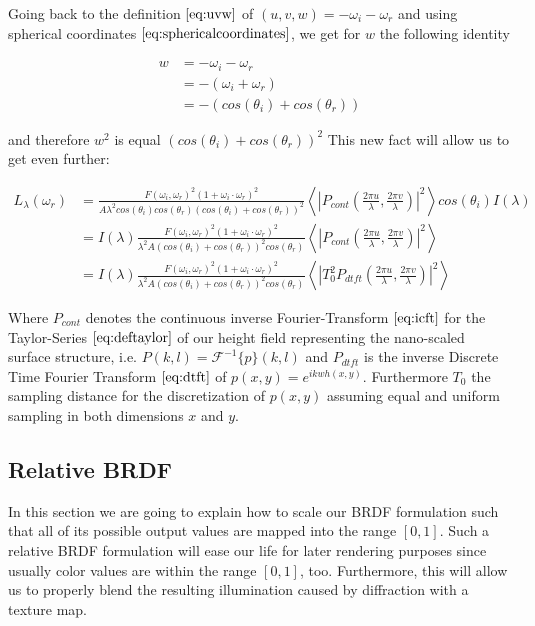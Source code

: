 Going back to the definition $\ref{eq:uvw}$ of $(u,v,w)= -\omega_i - \omega_r$ and using spherical coordinates $\ref{eq:sphericalcoordinates}$, we get for $w$ the following identity

\begin{align}
w 
&= -\omega_i - \omega_r \nonumber \\ 
&= -(\omega_i + \omega_r) \nonumber \\
&= -\left( cos(\theta_i)+cos(\theta_r) \right) 
\end{align}

and therefore $w^2$ is equal $(cos(\theta_i)+cos(\theta_r))^2$
This new fact will allow us to get even further:

\begin{align}
L_{\lambda}(\omega_r) 
& = \frac{F(\omega_i, \omega_r)^2 (1 + \omega_i \cdot \omega_r)^2}{A \lambda^2 cos(\theta_i)cos(\theta_r)  (cos(\theta_i)+cos(\theta_r))^2} \left \langle \left|P_{cont}\left( \frac{2\pi u}{\lambda}, \frac{2\pi v}{\lambda}\right) \right|^2 \right \rangle cos(\theta_i) I(\lambda) \nonumber \\
& = I(\lambda) \frac{F(\omega_i, \omega_r)^2 (1 + \omega_i \cdot \omega_r)^2}{\lambda^2 A (cos(\theta_i)+cos(\theta_r))^2 cos(\theta_r)} \left \langle \left|P_{cont}\left( \frac{2\pi u}{\lambda}, \frac{2\pi v}{\lambda}\right) \right|^2 \right \rangle \nonumber \\
& = I(\lambda) \frac{F(\omega_i, \omega_r)^2 (1 + \omega_i \cdot \omega_r)^2}{\lambda^2 A (cos(\theta_i)+cos(\theta_r))^2 cos(\theta_r)} \left \langle \left|T_0^2 P_{dtft}\left( \frac{2\pi u}{\lambda}, \frac{2\pi v}{\lambda}\right) \right|^2 \right \rangle
\label{eq:nonrelativebrdffinding}
\end{align}

Where $P_{cont}$ denotes the continuous inverse Fourier-Transform $\ref{eq:icft}$ for the Taylor-Series $\ref{eq:deftaylor}$ of our height field representing the nano-scaled surface structure, i.e. $P(k,l) = \mathcal{F}^{-1}\{p\}(k,l)$ and $P_{dtft}$ is the inverse Discrete Time Fourier Transform $\ref{eq:dtft}$ of $p(x,y) = e^{ikwh(x,y)}$. Furthermore $T_0$ the sampling distance for the discretization of $p(x,y)$ assuming equal and uniform sampling in both dimensions $x$ and $y$.

\subsection{Relative BRDF}
In this section we are going to explain how to scale our BRDF formulation such that all of its possible output values are mapped into the range $\left[0,1\right]$. Such a relative BRDF formulation will ease our life for later rendering purposes since usually color values are within the range $\left[0,1\right]$, too. Furthermore, this will allow us to properly blend the resulting illumination caused by diffraction with a texture map.

